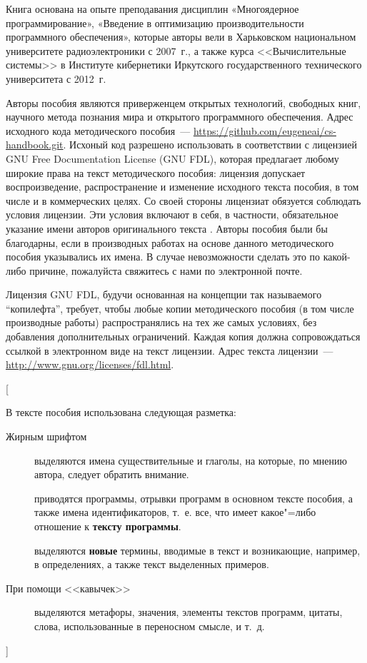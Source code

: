 \documentclass[14pt, openany, twoside, draft]{extbook} %
\newcommand{\e}[2][fcolor]{\textcolor{pcolor}{[}\textcolor{#1}{#2}\textcolor{pcolor}{]}}
\begin{document}
Книга основана на опыте преподавания дисциплин «Многоядерное
программирование», «Введение в оптимизацию производительности
программного обеспечения», которые авторы вели в Харьковском
национальном университете радиоэлектроники с 2007~г., а также курса
<<Вычислительные системы>> в Институте кибернетики Иркутского
государственного технического университета с 2012~г.

Авторы пособия являются приверженцем открытых технологий, свободных
книг, научного метода познания мира и открытого программного
обеспечения.  Адрес исходного кода методического пособия~---
\url{https://github.com/eugeneai/cs-handbook.git}. Исхоный код
разрешено использовать в соответствии с лицензией
\foreignlanguage{english}{GNU Free Documentation License (GNU FDL)},
которая предлагает любому широкие права на текст методического
пособия: лицензия допускает воспроизведение, распространение и
изменение исходного текста пособия, в том числе и в коммерческих
целях.  Со своей стороны лицензиат обязуется соблюдать условия
лицензии.  Эти условия включают в себя, в частности, обязательное
указание имени авторов оригинального текста \cite{GNUFDL}.  Авторы
пособия были бы благодарны, если в производных работах на основе
данного методического пособия указывались их имена.  В случае
невозможности сделать это по какой-либо причине, пожалуйста свяжитесь
с нами по электронной почте.

Лицензия GNU FDL, будучи основанная на концепции так называемого
``копилефта'', требует, чтобы любые копии методического пособия (в том
числе производные работы) распространялись на тех же самых условиях,
без добавления дополнительных ограничений.  Каждая копия должна
сопровождаться ссылкой в электронном виде на текст лицензии.  Адрес текста лицензии~---  \url{http://www.gnu.org/licenses/fdl.html}.

\e{
В тексте пособия использована следующая разметка:
\begin{description}
\item[Жирным шрифтом] выделяются имена существительные и глаголы, на которые, по мнению автора, следует обратить внимание.
\item[\normalfont{\tt Моноширинным шрифтом}] приводятся программы, отрывки программ в основном тексте пособия, а также имена идентификаторов, т.~е. все, что имеет какое"=либо отношение к {\bf тексту программы}.
\item[\normalfont{\em Наклонным шрифтом}] выделяются {\bf новые} термины, вводимые в текст и возникающие, например, в определениях, а также текст выделенных примеров.
\item[\normalfont При помощи <<кавычек>>] выделяются метафоры, значения, элементы текстов программ, цитаты, слова, использованные в переносном смысле, и т.~д.
\end{description}
}
\end{document}
